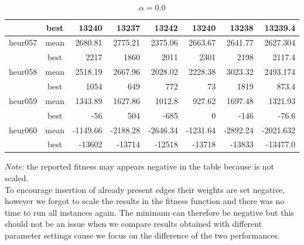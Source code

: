\documentclass[a4paper,12pt]{article}
\begin{document}
\begin{table}[H]
\begin{tabular}{l|c|r|r|r|r|r|r}
                & best & 13240 & 13237 & 13242 & 13240 & 13238 & 13239.4 \\
        \hline
        heur057 & mean & 2680.81 & 2775.21 & 2375.06 & 2663.67 & 2641.77 & 2627.304 \\
                & best & 2217 & 1860 & 2011 & 2301 & 2198 & 2117.4\\
        \hline
        heur058 & mean & 2518.19 & 2667.96 & 2028.02 & 2228.38 & 3023.32 & 2493.174\\
                & best & 1054 & 649 & 772 & 73  & 1819  & 873.4\\
        \hline
        heur059 & mean & 1343.89 & 1627.86 & 1012.8 & 927.62 & 1697.48 &  1321.93 \\
                & best & -56 & 504 & -685 & 0 & -146 & -76.6\\
        \hline
        heur060 & mean & -1149.66 & -2188.28 & -2646.34 & -1231.64 & -2892.24 & -2021.632 \\
                & best & -13602 & -13714 & -12518 & -13718 & -13833 & -13477.0 \\
    \end{tabular}
    \caption{$\alpha = 0.0$}
    \label{tab:my_label}
\end{table} 
\noindent
\emph{Note:} the reported fitness may appears negative in the table because is not scaled.\\ To encourage insertion of already present edges their weights are set negative, however we forgot to scale the results in the fitness function and there was no time to run all instances again. The minimum can therefore be negative but this should not be an issue when we compare results obtained with different parameter settings cause we focus on the difference of the two performances.
\end{document}
